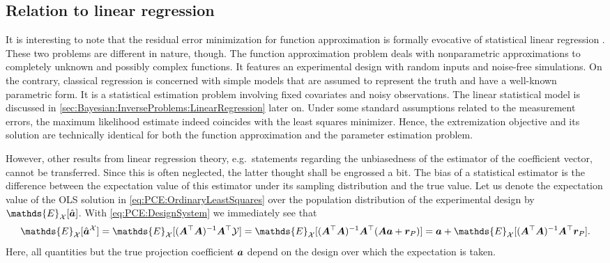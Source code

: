 \subsection{Relation to linear regression}
It is interesting to note that the residual error minimization for function approximation is formally evocative of statistical linear regression \cite{Statistics:Su2012}.
These two problems are different in nature, though.
The function approximation problem deals with nonparametric approximations to completely unknown and possibly complex functions.
It features an experimental design with random inputs and noise-free simulations.
On the contrary, classical regression is concerned with simple models that are assumed to represent the truth and have a well-known parametric form.
It is a statistical estimation problem involving fixed covariates and noisy observations.
The linear statistical model is discussed in \cref{sec:Bayesian:InverseProblems:LinearRegression} later on.
Under some standard assumptions related to the measurement errors, the maximum likelihood estimate indeed coincides with the least squares minimizer.
Hence, the extremization objective and its solution are technically identical for both the function approximation and the parameter estimation problem.
\par %
However, other results from linear regression theory, e.g.\ statements regarding the unbiasedness of the estimator of the coefficient vector, cannot be transferred.
Since this is often neglected, the latter thought shall be engrossed a bit.
The bias of a statistical estimator is the difference between the expectation value of this estimator under its sampling distribution and the true value.
Let us denote the expectation value of the OLS solution in \cref{eq:PCE:OrdinaryLeastSquares}
over the population distribution of the experimental design by \(\mathds{E}_\mathcal{X}[\hat{\bm{\coeffM}}]\).
With \cref{eq:PCE:DesignSystem} we immediately see that
\begin{equation} \label{eq:PCE:CoefficientBias}
  \mathds{E}_\mathcal{X}[\hat{\bm{\coeffM}}^{\mathcal{X}}]
  = \mathds{E}_\mathcal{X}[(\bm{A}^\top \bm{A})^{-1} \bm{A}^\top \mathcal{Y}]
  = \mathds{E}_\mathcal{X}[(\bm{A}^\top \bm{A})^{-1} \bm{A}^\top (\bm{A} \bm{\coeffM} + \bm{r}_P)]
  = \bm{\coeffM} + \mathds{E}_\mathcal{X}[(\bm{A}^\top \bm{A})^{-1} \bm{A}^\top \bm{r}_P].
\end{equation}
Here, all quantities but the true projection coefficient \(\bm{a}\) depend on the design over which the expectation is taken.
